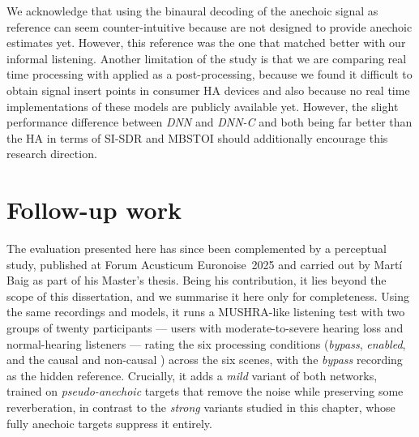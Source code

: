 We acknowledge that using the binaural decoding of the anechoic signal as reference can seem counter-intuitive because 
are not designed to provide anechoic estimates yet. However, this
reference was the one that matched better with our informal listening. Another limitation of the study is that we are comparing
real time  processing with  applied as a post-processing,
because we found it difficult to obtain signal insert points in consumer HA devices and also because no real time implementations
of these models are publicly available yet. However, the slight performance difference between \emph{DNN} and \emph{DNN-C} and both being far
better than the HA in terms of \acrshort{SI-SDR} and \acrshort{MBSTOI} should additionally encourage this research direction.


\section{Follow-up work}
\label{sec:ha_followup}

The evaluation presented here has since been complemented by a perceptual study,
published at Forum Acusticum Euronoise~2025 \citep{baig2025perceptual} and carried
out by Mart\'i Baig as part of his Master's thesis. Being his contribution, it
lies beyond the scope of this dissertation, and we summarise it here only for
completeness. Using the same recordings and models, it runs a \acrfull{MUSHRA}-like
listening test with two groups of twenty participants ---  users
with moderate-to-severe hearing loss and normal-hearing listeners --- rating the
six processing conditions (\emph{bypass}, \emph{enabled}, and the causal and
non-causal ) across the six scenes, with the \emph{bypass}
recording as the hidden reference. Crucially, it adds a \emph{mild} variant of
both networks, trained on \emph{pseudo-anechoic} targets that remove the noise
while preserving some reverberation, in contrast to the \emph{strong} variants
studied in this chapter, whose fully anechoic targets suppress it entirely.

